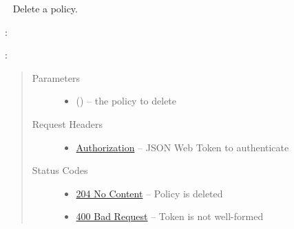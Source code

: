 \documentclass[letterpaper,10pt,english]{sphinxmanual}
\begin{document}
\begin{fulllineitems}
\label{\detokenize{resources/policy:delete--policies-(policy_id)}}~
Delete a policy.

:

\begin{sphinxVerbatim}[commandchars=\\\{\}]
  
 
 
\end{sphinxVerbatim}

:

\begin{sphinxVerbatim}[commandchars=\\\{\}]
  
\end{sphinxVerbatim}
\begin{quote}\begin{description}
\item[{Parameters}] \leavevmode\begin{itemize}
\item {} 
 () -- the policy to delete

\end{itemize}

\item[{Request Headers}] \leavevmode\begin{itemize}
\item {} 
\href{http://tools.ietf.org/html/rfc7235\#section-4.2}{Authorization} -- JSON Web Token to authenticate

\end{itemize}

\item[{Status Codes}] \leavevmode\begin{itemize}
\item {} 
\href{http://www.w3.org/Protocols/rfc2616/rfc2616-sec10.html\#sec10.2.5}{204 No Content} -- Policy is deleted

\item {} 
\href{http://www.w3.org/Protocols/rfc2616/rfc2616-sec10.html\#sec10.4.1}{400 Bad Request} -- Token is not well-formed


\end{itemize}
\end{description}
\end{quote}
\end{fulllineitems}
\end{document}
